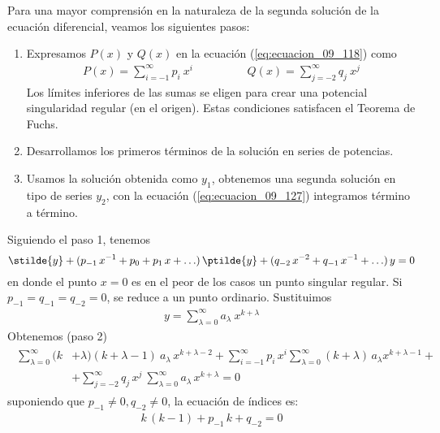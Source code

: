 Para una mayor comprensión en la naturaleza de la segunda solución de la ecuación diferencial, veamos los siguientes pasos:
\begin{enumerate}
\item Expresamos $P(x)$ y $Q(x)$ en la ecuación (\ref{eq:ecuacion_09_118}) como
\begin{align}
P(x) = \sum_{i=-1}^{\infty} p_{i} \: x^{i} \hspace{2cm} Q(x) = \sum_{j=-2}^{\infty} q_{j} \: x^{j}
\label{eq:ecuacion_09_129}
\end{align}
Los límites inferiores de las sumas se eligen para crear una potencial singularidad regular (en el origen). Estas condiciones satisfacen el Teorema de Fuchs.
\item Desarrollamos los primeros términos de la solución en series de potencias.
\item Usamos la solución obtenida como $y_{1}$, obtenemos una segunda solución en tipo de series $y_{2}$, con la ecuación (\ref{eq:ecuacion_09_127}) integramos término a término.
\end{enumerate}
Siguiendo el paso 1, tenemos
\begin{equation}
\stilde{y} + (p_{-1} \, x^{-1} + p_{0} + p_{1} \, x + \ldots) \, \ptilde{y} + (q_{-2} \, x^{-2} + q_{-1} \, x^{-1} + \ldots) \, y = 0
\label{eq:ecuacion_09_130}
\end{equation}
en donde el punto $x = 0$ es en el peor de los casos un punto singular regular. Si $p_{-1} = q_{-1} = q_{-2} = 0$, se reduce a un punto ordinario. Sustituimos
\begin{align*}
y = \sum_{\lambda = 0}^{\infty} a_{\lambda} \: x^{k + \lambda}
\end{align*}
Obtenemos (paso 2)
\begin{align}
\begin{aligned}
\sum_{\lambda=0}^{\infty} (k &+ \lambda)(k + \lambda - 1) \: a_{\lambda} \, x^{k + \lambda - 2} + \sum_{i=-1}^{\infty} p_{i} \, x^{i} \sum_{\lambda=0}^{\infty} (k + \lambda) \,  a_{\lambda} x^{k + \lambda - 1} + \\
&+ \sum_{j=-2}^{\infty} q_{j} \, x^{j} \: \sum_{\lambda=0}^{\infty} a_{\lambda} \, x^{k + \lambda} = 0
\end{aligned}
\label{eq:ecuacion_09_131}
\end{align}
suponiendo que $p_{-1} \neq 0, q_{-2} \neq 0$, la ecuación de índices es:
\begin{align*}
k \, (k - 1) + p_{-1} \, k + q_{-2} = 0
\end{align*}
